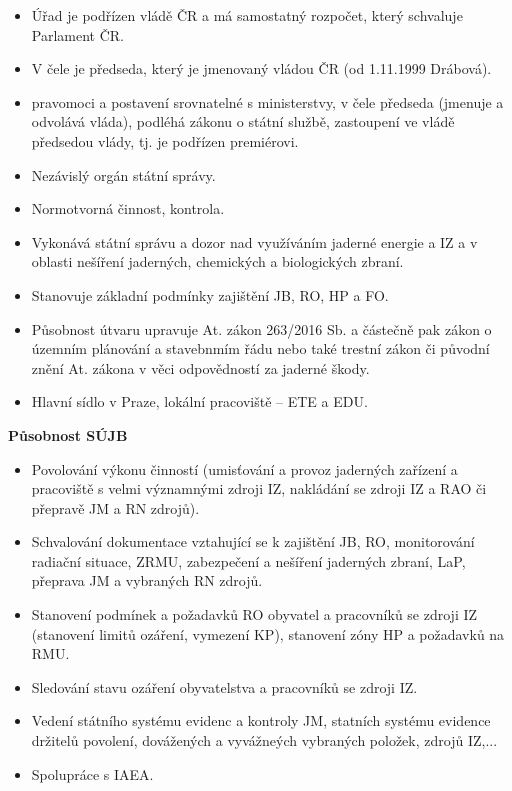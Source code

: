 \begin{itemize}
    \item Úřad je podřízen vládě ČR a má samostatný rozpočet, který schvaluje Parlament ČR.
    \item V čele je předseda, který je jmenovaný vládou ČR (od 1.11.1999 Drábová).
    \item pravomoci a postavení srovnatelné s ministerstvy, v čele předseda (jmenuje a odvolává vláda), podléhá zákonu o státní službě, zastoupení ve vládě předsedou vlády, tj. je podřízen premiérovi.
    \item Nezávislý orgán státní správy.
    \item Normotvorná činnost, kontrola.
    \item Vykonává státní správu a dozor nad využíváním jaderné energie a IZ a v oblasti nešíření jaderných, chemických a biologických zbraní.
    \item Stanovuje základní podmínky zajištění JB, RO, HP a FO.
    \item Působnost útvaru upravuje At. zákon 263/2016 Sb. a částečně pak zákon o územním plánování a stavebnmím řádu nebo také trestní zákon či původní znění At. zákona v věci odpovědností za jaderné škody.
    \item Hlavní sídlo v Praze, lokální pracoviště -- ETE a EDU.
\end{itemize}

\textbf{Působnost SÚJB}

\begin{itemize}
    \item Povolování výkonu činností (umisťování a provoz jaderných zařízení a pracoviště s velmi významnými zdroji IZ, nakládání se zdroji IZ a RAO či přepravě JM a RN zdrojů).
    \item Schvalování dokumentace vztahující se k zajištění JB, RO, monitorování radiační situace, ZRMU, zabezpečení a nešíření jaderných zbraní, LaP, přeprava JM a vybraných RN zdrojů.
    \item Stanovení podmínek a požadavků RO obyvatel a pracovníků se zdroji IZ (stanovení limitů ozáření, vymezení KP), stanovení zóny HP a požadavků na RMU.
    \item Sledování stavu ozáření obyvatelstva a pracovníků se zdroji IZ.
    \item Vedení státního systému evidenc a kontroly JM, statních systému evidence držitelů povolení, dovážených a vyvážneých vybraných položek, zdrojů IZ,...
    \item Spolupráce s IAEA.
\end{itemize}

